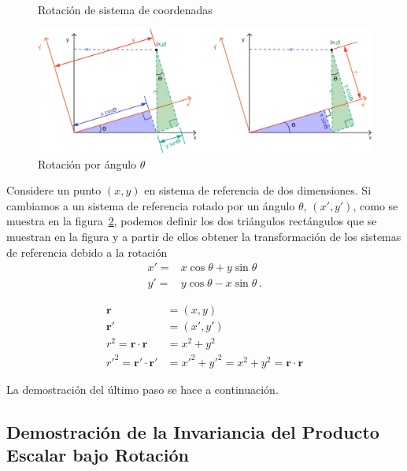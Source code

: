 \documentclass[11pt,a4paper]{article}
\begin{document}
\begin{figure}
  \caption{Rotación de sistema de coordenadas}
  \label{fig:tabla}
\end{figure}




\begin{figure}
  \centering
  \includegraphics[scale=0.75]{so2}
  \caption{Rotación por ángulo $\theta$}
  \label{fig:so2}
\end{figure}



Considere un punto $(x,y)$ en sistema de referencia de dos dimensiones. Si cambiamos a un sistema de referencia rotado por un ángulo $\theta$, $(x',y')$, como se muestra en la figura~\ref{fig:so2}, podemos definir los dos triángulos rectángulos que se muestran en la figura y a partir de ellos obtener la transformación de los sistemas de referencia debido a la rotación
\begin{align}
  x'=&x\cos\theta+y\sin\theta \nonumber\\
  y'=&y\cos\theta-x\sin\theta\,.
\end{align}


\begin{align*}
    \boldsymbol{r} &= (x, y) \\
    \boldsymbol{r}' &= (x', y') \\[1em] %
    r^2 = \boldsymbol{r} \cdot \boldsymbol{r} &= x^2 + y^2 \\
  {r'}^2 =  \boldsymbol{r}' \cdot \boldsymbol{r}' &= x'^2 + y'^2 = x^2 + y^2 = \boldsymbol{r} \cdot \boldsymbol{r}
\end{align*}

La demostración del último paso se hace a continuación.


\subsection*{Demostración de la Invariancia del Producto Escalar bajo Rotación}
\end{document}
